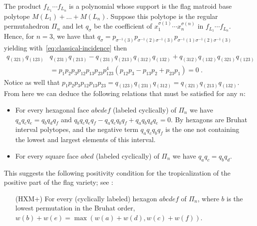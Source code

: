 The product $f_{L_1}\cdots f_{L_n}$ is a polynomial whose support is the flag matroid base polytope $M(L_1) + \dots+ M(L_n)$. 
Suppose this polytope is the regular permutahedron $\Pi_n$ and let $q_\sigma$ be the coefficient of $x_1^{\sigma(1)}\cdots x_n^{\sigma(n)}$ in $f_{L_1}\cdots f_{L_n}$.
Hence, for $n=3$, we have that $q_{\sigma} = p_{\sigma^{-1}(3)}p_{\sigma^{-1}(2)\sigma^{-1}(3)}p_{\sigma^{-1}(1)\sigma^{-1}(2)\sigma^{-1}(3)}$ yielding with~\eqref{eq:classical-incidence} then 
\[
\begin{aligned}
	q_{(321)}q_{(123)}&q_{(231)}q_{(213)} - q_{(231)}q_{(213)}q_{(312)}q_{(132)} +  q_{(312)}q_{(132)}q_{(321)}q_{(123)} \\
	&= p_1p_2p_3p_{12}p_{13}p_{23}p_{123}^4 \left(p_{12}p_3-p_{13}p_2+p_{23}p_1 \right) = 0 \;.
\end{aligned}
\]
Notice as well that $p_1p_2p_3p_{12}p_{13}p_{23} = q_{(123)}q_{(231)}q_{(312)}=q_{(321)}q_{(213)}q_{(132)}$.
From here we can deduce the following relations that must be satisfied for any $n$:
\begin{itemize}
	\item For every hexagonal face $abcdef$ (labeled cyclically) of $\Pi_n$ we have $q_aq_cq_e = q_bq_dq_f$ and $q_bq_cq_eq_f -q_aq_cq_bq_f+ q_aq_bq_dq_e = 0$. By \cite[Section 4.3]{TsukermanWilliams} hexagons are Bruhat interval polytopes, and the negative term  $q_aq_cq_bq_f$ is the one not containing the lowest and largest elements of this interval.
	\item For every square face $abcd$ (labeled cyclically) of $\Pi_n$ we have $q_aq_c = q_bq_d$.
\end{itemize}

%

This suggests the following positivity condition for the tropicalization of the positive part of the flag variety; see : 
\begin{enumerate}[leftmargin=*, widest=XXXXX]
	\item[(HXM+)] \label{eq:positiveflag} For every (cyclically labeled) hexagon $abcdef$ of $\Pi_n$, where $b$ is the lowest permutation in the Bruhat order, $w(b)+w(e) = \max(w(a)+w(d), w(c)+w(f))$.
\end{enumerate}

